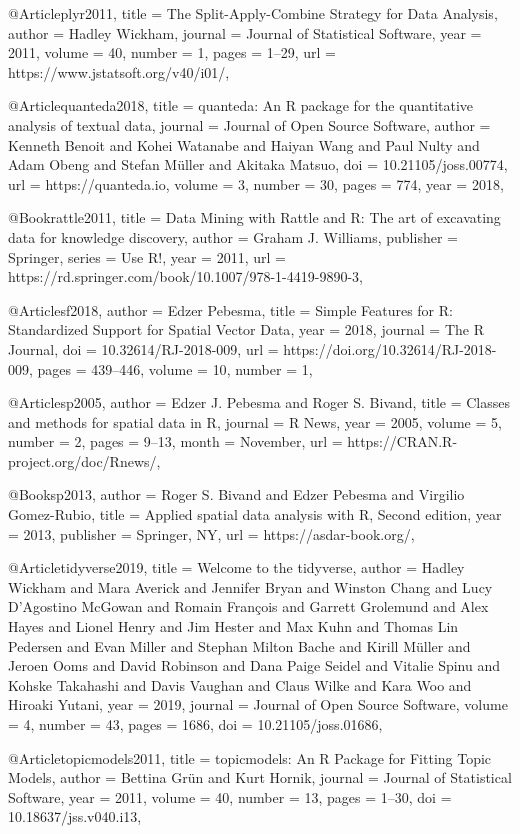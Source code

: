 @Article{plyr2011,
  title = {The Split-Apply-Combine Strategy for Data Analysis},
  author = {Hadley Wickham},
  journal = {Journal of Statistical Software},
  year = {2011},
  volume = {40},
  number = {1},
  pages = {1--29},
  url = {https://www.jstatsoft.org/v40/i01/},
}

@Article{quanteda2018,
  title = {quanteda: An R package for the quantitative analysis of textual data},
  journal = {Journal of Open Source Software},
  author = {Kenneth Benoit and Kohei Watanabe and Haiyan Wang and Paul Nulty and Adam Obeng and Stefan Müller and Akitaka Matsuo},
  doi = {10.21105/joss.00774},
  url = {https://quanteda.io},
  volume = {3},
  number = {30},
  pages = {774},
  year = {2018},
}

@Book{rattle2011,
  title = {Data Mining with {Rattle} and {R}: The art of excavating data for knowledge discovery},
  author = {Graham J. Williams},
  publisher = {Springer},
  series = {Use R!},
  year = {2011},
  url = {https://rd.springer.com/book/10.1007/978-1-4419-9890-3},
}

@Article{sf2018,
  author = {Edzer Pebesma},
  title = {{Simple Features for R: Standardized Support for Spatial Vector Data}},
  year = {2018},
  journal = {{The R Journal}},
  doi = {10.32614/RJ-2018-009},
  url = {https://doi.org/10.32614/RJ-2018-009},
  pages = {439--446},
  volume = {10},
  number = {1},
}

@Article{sp2005,
  author = {Edzer J. Pebesma and Roger S. Bivand},
  title = {Classes and methods for spatial data in {R}},
  journal = {R News},
  year = {2005},
  volume = {5},
  number = {2},
  pages = {9--13},
  month = {November},
  url = {https://CRAN.R-project.org/doc/Rnews/},
}

@Book{sp2013,
  author = {Roger S. Bivand and Edzer Pebesma and Virgilio Gomez-Rubio},
  title = {Applied spatial data analysis with {R}, Second edition},
  year = {2013},
  publisher = {Springer, NY},
  url = {https://asdar-book.org/},
}

@Article{tidyverse2019,
  title = {Welcome to the {tidyverse}},
  author = {Hadley Wickham and Mara Averick and Jennifer Bryan and Winston Chang and Lucy D'Agostino McGowan and Romain François and Garrett Grolemund and Alex Hayes and Lionel Henry and Jim Hester and Max Kuhn and Thomas Lin Pedersen and Evan Miller and Stephan Milton Bache and Kirill Müller and Jeroen Ooms and David Robinson and Dana Paige Seidel and Vitalie Spinu and Kohske Takahashi and Davis Vaughan and Claus Wilke and Kara Woo and Hiroaki Yutani},
  year = {2019},
  journal = {Journal of Open Source Software},
  volume = {4},
  number = {43},
  pages = {1686},
  doi = {10.21105/joss.01686},
}

@Article{topicmodels2011,
  title = {{topicmodels}: An {R} Package for Fitting Topic Models},
  author = {Bettina Gr\"un and Kurt Hornik},
  journal = {Journal of Statistical Software},
  year = {2011},
  volume = {40},
  number = {13},
  pages = {1--30},
  doi = {10.18637/jss.v040.i13},
}

